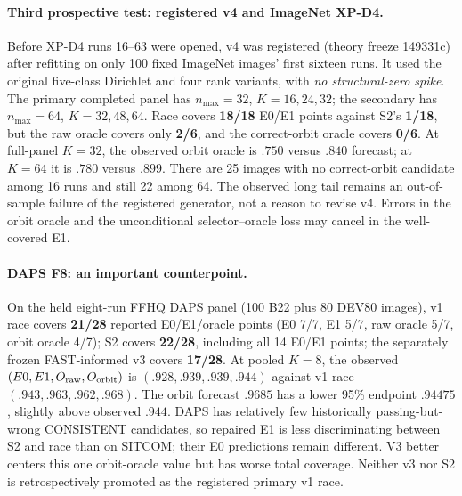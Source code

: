 \paragraph{Third prospective test: registered v4 and ImageNet XP-D4.}
Before XP-D4 runs 16--63 were opened, v4 was registered
(theory freeze 149331c) after refitting on only
100 fixed ImageNet images' first sixteen runs.
It used the original five-class Dirichlet and four
rank variants, with \emph{no structural-zero spike}.
The primary completed panel has $n_{\max}=32$,
$K=16,24,32$; the secondary has $n_{\max}=64$,
$K=32,48,64$. Race covers \textbf{18/18} E0/E1
points against S2's \textbf{1/18}, but the raw oracle
covers only \textbf{2/6}, and the correct-orbit oracle
covers \textbf{0/6}. At full-panel $K=32$,
the observed orbit oracle is $.750$ versus $.840$
forecast; at $K=64$ it is $.780$ versus $.899$.
There are 25 images with no correct-orbit candidate
among 16 runs and still 22 among 64. The observed
long tail remains an out-of-sample failure of the
registered generator, not a reason to revise v4.
Errors in the orbit oracle and the unconditional
selector--oracle loss may cancel in the well-covered E1.

\paragraph{DAPS F8: an important counterpoint.}
On the held eight-run FFHQ DAPS panel (100 B22 plus
80 DEV80 images), v1 race covers \textbf{21/28}
reported E0/E1/oracle points (E0 7/7, E1 5/7,
raw oracle 5/7, orbit oracle 4/7); S2 covers
\textbf{22/28}, including all 14 E0/E1 points;
the separately frozen FAST-informed v3 covers
\textbf{17/28}. At pooled $K=8$, the observed
$(E0,E1,O_{\rm raw},O_{\rm orbit})$ is
$(.928,.939,.939,.944)$ against v1 race
$(.943,.963,.962,.968)$. The orbit forecast
$.9685$ has a lower 95\% endpoint $.94475$,
slightly above observed $.944$. DAPS has relatively
few historically passing-but-wrong CONSISTENT candidates,
so repaired E1 is less discriminating between
S2 and race than on SITCOM; their E0 predictions
remain different. V3 better centers this one
orbit-oracle value but has worse total coverage.
Neither v3 nor S2 is retrospectively promoted as
the registered primary v1 race.

